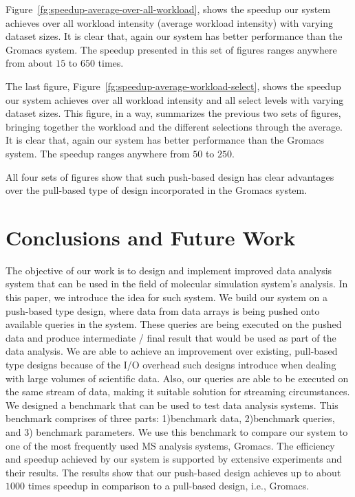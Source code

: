 \documentclass[10pt,journal,final,letterpaper,twocolumn]{IEEEtran}
\begin{document}
Figure~\ref{fg:speedup-average-over-all-workload}, shows the speedup
our system achieves over all workload intensity (average workload
intensity) with varying dataset sizes. It is clear that, again our
system has better performance than the Gromacs system. The speedup
presented in this set of figures ranges anywhere from about $15$ to
$650$ times.


The last figure, Figure~\ref{fg:speedup-average-workload-select},
shows the speedup our system achieves over all workload intensity
and all select levels with varying dataset sizes. This figure, in a
way, summarizes the previous two sets of figures, bringing together
the workload and the different selections through the average. It is
clear that, again our system has better performance than the Gromacs
system. The speedup ranges anywhere from $50$ to $250$.

All four sets of figures show that such push-based design has clear
advantages over the pull-based type of design incorporated in the
Gromacs system.



\section{Conclusions and Future Work}\label{sc:conclusion}
The objective of our work is to design and implement improved data
analysis system that can be used in the field of molecular
simulation system's analysis. In this paper, we introduce the idea
for such system. We build our system on a push-based type design,
where data from data arrays is being pushed onto available queries
in the system. These queries are being executed on the pushed data
and produce intermediate / final result that would be used as part
of the data analysis. We are able to achieve an improvement over
existing, pull-based type designs because of the I/O overhead such
designs introduce when dealing with large volumes of scientific
data. Also, our queries are able to be executed on the same stream
of data, making it suitable solution for streaming circumstances. We
designed a benchmark that can be used to test data analysis systems.
This benchmark comprises of three parts: 1)benchmark data,
2)benchmark queries, and 3) benchmark parameters. We use this
benchmark to compare our system to one of the most frequently used
MS analysis systems, Gromacs. The efficiency and speedup achieved by
our system is supported by extensive experiments and their results.
The results show that our push-based design achieves up to about
$1000$ times speedup in comparison to a pull-based design, i.e.,
Gromacs.
\end{document}
